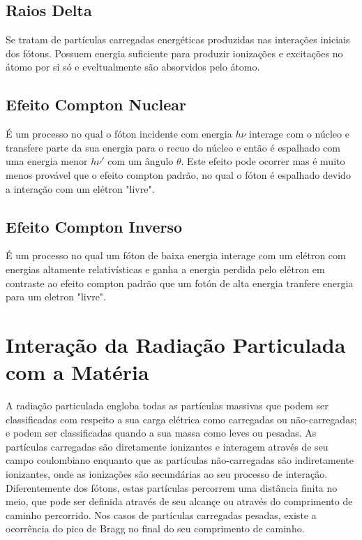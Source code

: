 \documentclass[11pt,a4paper]{article}
\begin{document}
\subsection*{Raios Delta}

	Se tratam de partículas carregadas energéticas produzidas nas interações iniciais dos fótons. Possuem energia suficiente para produzir ionizações e excitações no átomo por si só e eveltualmente são absorvidos pelo átomo.

\subsection*{Efeito Compton Nuclear}

    É um processo no qual o fóton incidente com energia $h\nu$ interage com o núcleo e transfere parte da sua energia para o recuo do núcleo e então é espalhado com uma energia menor $h\nu'$ com um ângulo $\theta$. Este efeito pode ocorrer mas é muito menos provável que o efeito compton padrão, no qual o fóton é espalhado devido a interação com um elétron "livre".

\subsection*{Efeito Compton Inverso}

    É um processo no qual um fóton de baixa energia interage com um elétron com energias altamente relativísticas e ganha a energia perdida pelo elétron em contraste ao efeito compton padrão que um fotón de alta energia tranfere energia para um eletron "livre". 
        
\section{Interação da Radiação Particulada com a Matéria}

    A radiação particulada engloba todas as partículas massivas que podem ser classificadas com respeito a sua carga elétrica como carregadas ou não-carregadas; e podem ser classificadas quando a sua massa como leves ou pesadas. As partículas carregadas são diretamente ionizantes e interagem através de seu campo coulombiano enquanto que as partículas não-carregadas são indiretamente ionizantes, onde as ionizações são secundárias ao seu processo de interação. Diferentemente dos fótons, estas partículas percorrem uma distância finita no meio, que pode ser definida através de seu alcançe ou através do comprimento de caminho percorrido. Nos casos de partículas carregadas pesadas, existe a ocorrência do pico de Bragg no final do seu comprimento de caminho.
\end{document}
